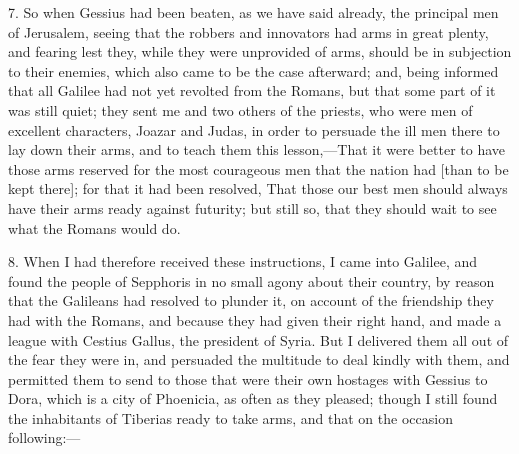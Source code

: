 7. So when Gessius had been beaten, as we have said already, the principal
men of Jerusalem, seeing that the robbers and innovators had arms in great
plenty, and fearing lest they, while they were unprovided of arms, should
be in subjection to their enemies, which also came to be the case
afterward; and, being informed that all Galilee had not yet revolted from
the Romans, but that some part of it was still quiet; they sent me and two
others of the priests, who were men of excellent characters, Joazar and
Judas, in order to persuade the ill men there to lay down their arms, and
to teach them this lesson,—That it were better to have those arms
reserved for the most courageous men that the nation had [than to be kept
there]; for that it had been resolved, That those our best men should
always have their arms ready against futurity; but still so, that they
should wait to see what the Romans would do.

8. When I had therefore received these instructions, I came into Galilee,
and found the people of Sepphoris in no small agony about their country,
by reason that the Galileans had resolved to plunder it, on account of the
friendship they had with the Romans, and because they had given their
right hand, and made a league with Cestius Gallus, the president of Syria.
But I delivered them all out of the fear they were in, and persuaded the
multitude to deal kindly with them, and permitted them to send to those
that were their own hostages with Gessius to Dora, which is a city of
Phoenicia, as often as they pleased; though I still found the inhabitants
of Tiberias ready to take arms, and that on the occasion following:—

